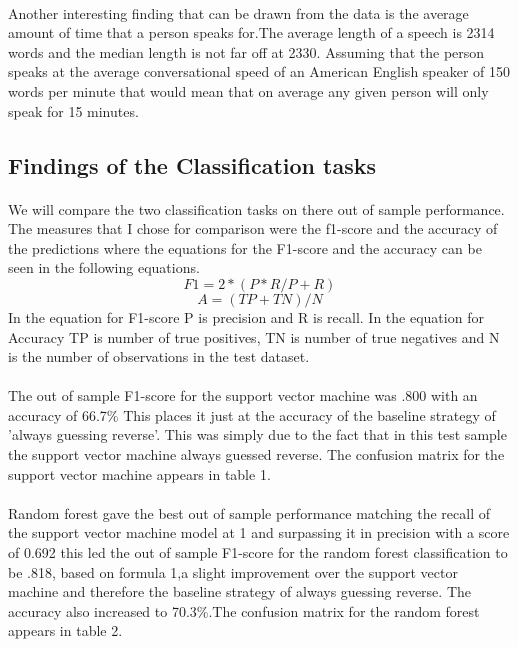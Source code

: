 \documentclass[12pt,english]{article}
\begin{document}
\paragraph{}
Another interesting finding that can be drawn from the data is the average amount of time that a person speaks for.The average length of a speech is 2314 words and the median length is not far off at 2330. Assuming that the person speaks at the average conversational speed of an American English speaker of 150 words per minute\citep{noauthor_national_nodate} that would mean that on average any given person will only speak for 15 minutes.
\subsection{Findings of the Classification tasks}
\paragraph{}
 We will compare the two classification tasks on there out of sample performance. The measures that I chose for comparison were the f1-score and the accuracy of the predictions where the equations for the F1-score and the accuracy can be seen in the following equations.
\[F1= 2*(P*R/P+R)\]
\[A=(TP+TN)/N\]
In the equation for F1-score P is precision and R is recall.
In the equation for Accuracy TP is number of true positives, TN is number of true negatives and N is the number of observations in the test dataset.
\paragraph{}
The out of sample F1-score for the support vector machine was .800 with an accuracy of 66.7\% This places it just at the accuracy of the baseline strategy of 'always guessing reverse'. This was simply due to the fact that in this test sample the support vector machine always guessed reverse. The confusion matrix for the support vector machine appears in table 1. 
\paragraph{}
Random forest gave the best out of sample performance matching the recall of the support vector machine model at 1 and surpassing it in precision with a score of 0.692 this led the out of sample F1-score for the random forest classification to be .818, based on formula 1,a slight improvement over the support vector machine and therefore the baseline strategy of always guessing reverse. The accuracy also increased to 70.3\%.The confusion matrix for the random forest appears in table 2. 
\end{document}
